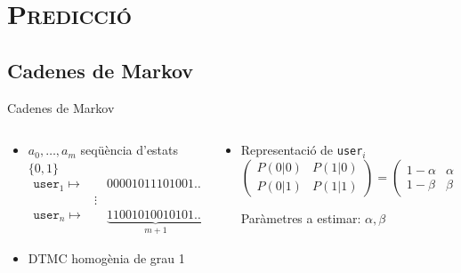 \documentclass[xcolor=x11names,
								compress,
								aspectratio=1610]{beamer}
\newcommand{\mt}[1]{\texttt{#1}}
\theoremstyle{definition}%
\renewcommand{\(}{\begin{columns}}
\renewcommand{\)}{\end{columns}}
\newcommand{\<}[1]{\begin{column}{#1}}
\renewcommand{\>}{\end{column}}
\begin{document}
\section{\scshape Predicció}
\subsection{Cadenes de Markov}
\begin{frame}{Cadenes de Markov}
	\begin{columns}[onlytextwidth]
		\begin{column}{.5\textwidth}
			\begin{itemize}
			\item $a_0,\ldots,a_m$ seqüència d'estats $\{0,1\}$
			\begin{align*}
      	\mt{user}_1 \mapsto & \quad 00001011101001\ldots \\
      	 & \vdots \\
      	\mt{user}_n \mapsto & \quad \underbrace{11001010010101\ldots}_{m+1} 
      \end{align*}
      \item DTMC homogènia de grau 1
      \begin{center}
      \end{center}
			\end{itemize}
			
		\end{column}
		\begin{column}{.5\textwidth}
			\begin{itemize}
			\item Representació de \mt{user}$_i$ 
			$$
      \begin{pmatrix}
      P(0|0) & P(1|0) \\
      P(0|1) & P(1|1)
      \end{pmatrix}
      = 
      \begin{pmatrix}
      1 - \alpha & \alpha \\
      1 - \beta & \beta
      \end{pmatrix}
      $$
      
      Paràmetres a estimar: $\alpha,\beta$
			\vspace{4.6cm}
			\end{itemize}
		\end{column}
	\end{columns}
\end{frame}
\end{document}
